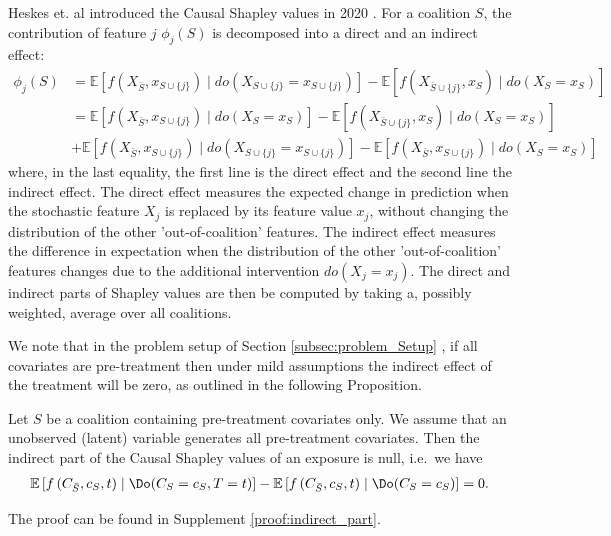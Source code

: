 Heskes et. al introduced the Causal Shapley values in 2020 . For a coalition $S$, the contribution of feature $j$ $\phi_{j}(S)$  is decomposed into a direct and an indirect effect:
$$
\begin{aligned}
\phi_{j}(S)
&= \mathbb{E}\left[f\left(X_{\bar{S}}, x_{S \cup \{j\}}\right) \mid d o\left(X_{S \cup \{j\}}=x_{S \cup \{j\}}\right)\right]-\mathbb{E}\left[f\left(X_{\bar{S} \cup \{j\}}, x_{S}\right) \mid d o\left(X_{S}=x_{S}\right)\right]\\
&= \mathbb{E}\left[f\left(X_{\bar{S}}, x_{S \cup \{j\}}\right) \mid d o\left(X_{S}=x_{S}\right)\right]-\mathbb{E}\left[f\left(X_{\bar{S} \cup \{j\}}, x_{S}\right) \mid d o\left(X_{S}=x_{S}\right)\right] \\
&+ \mathbb{E}\left[f\left(X_{\bar{S}}, x_{S \cup \{j\}}\right) \mid d o\left(X_{S \cup \{j\}}=x_{S \cup \{j\}}\right)\right]-\mathbb{E}\left[f\left(X_{\bar{S}}, x_{S \cup \{j\}}\right) \mid d o\left(X_{S}=x_{S}\right)\right] 
\end{aligned}
$$
where, in the last equality, the first line is the direct effect and the second line the indirect effect. The direct effect measures the expected change in prediction when the stochastic feature $X_{j}$ is replaced by its feature value $x_{j}$, without changing the distribution of the other 'out-of-coalition' features. The indirect effect measures the difference in expectation when the distribution of the other 'out-of-coalition' features changes due to the additional intervention $d o\left(X_{j}=x_{j}\right)$. The direct and indirect parts of Shapley values are then be computed by taking a, possibly weighted, average over all coalitions. 

We note that in the problem setup of Section \ref{subsec:problem_Setup}
, if all covariates are pre-treatment then under mild assumptions the indirect effect of the treatment will be zero, as outlined in the following Proposition.


\begin{property} \label{prop:indirect_part} Let $S$ be a coalition containing pre-treatment covariates only. We assume that an unobserved (latent) variable generates all pre-treatment covariates. Then the indirect part of the Causal Shapley values of an exposure is null, i.e.~we have
\begin{align}
    \mathbb{E}\left[f\left({C}_{\bar{S}}, c_{S}, t\right) \mid \Do({C}_{S}=c_S, T=t)\right]-\mathbb{E}\left[f\left(C_{\bar{S}}, c_{S}, t\right) \mid \Do({C}_{S}=c_{S})\right]  = 0.
\end{align}
\end{property}
\vspace*{-0.2cm}
The proof can be found in Supplement  \ref{proof:indirect_part}.
